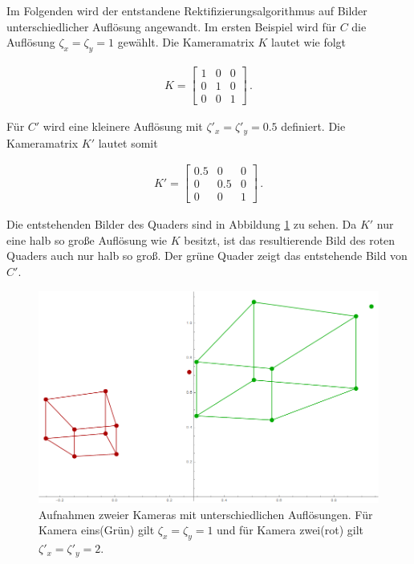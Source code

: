 Im Folgenden wird der entstandene Rektifizierungsalgorithmus auf Bilder unterschiedlicher Auflösung angewandt. Im ersten Beispiel wird für $C$ die Auflösung $\zeta_x = \zeta_y =1$ gewählt. Die Kameramatrix $K$ lautet wie folgt


\begin{gather}
	K = 
	\begin{bmatrix}
	1&0&0\\
	0&1&0\\
	0&0&1
	\end{bmatrix} \, .
\end{gather}

Für $C'$ wird eine kleinere Auflösung mit $\zeta'_x = \zeta'_y = 0.5$ definiert. Die Kameramatrix $K'$ lautet somit

\begin{gather}
K' = 
	\begin{bmatrix}
	0.5&0&0\\
	0&0.5&0\\
	0&0&1
	\end{bmatrix} \, .
\end{gather} 


Die entstehenden Bilder des Quaders sind in Abbildung \ref{fig:AbbRecDifRes} zu sehen. Da $K'$ nur eine halb so große Auflösung wie $K$ besitzt, ist das resultierende Bild des roten Quaders auch nur halb so groß. Der grüne Quader zeigt das entstehende Bild von $C'$.
\pagebreak

\begin{figure}[!htb]
	\centering
	\includegraphics[width=.8\linewidth]{images/Rectification_one_different_Solutions.png}
	\caption[Virtuelle Aufnahme mit unterschiedlichen Auflösung für die Rektifizierung]{Aufnahmen zweier Kameras mit unterschiedlichen Auflösungen. Für Kamera eins(Grün) gilt \ensuremath{\zeta_x = \zeta_y = 1}  und für Kamera zwei(rot) gilt \ensuremath{\zeta'_x = \zeta'_y= 2}.} 
	\label{fig:AbbRecDifRes}
\end{figure}


